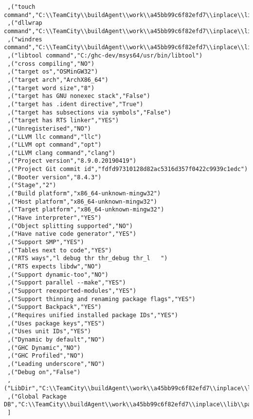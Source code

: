 \begin{verbatim}
 ,("touch command","C:\\TeamCity\\buildAgent\\work\\a45bb99c6f82efd7\\inplace\\lib/bin/touchy.exe")
 ,("dllwrap command","C:\\TeamCity\\buildAgent\\work\\a45bb99c6f82efd7\\inplace\\lib\\../mingw/bin/dllwrap.exe")
 ,("windres command","C:\\TeamCity\\buildAgent\\work\\a45bb99c6f82efd7\\inplace\\lib\\../mingw/bin/windres.exe")
 ,("libtool command","C:/ghc-dev/msys64/usr/bin/libtool")
 ,("cross compiling","NO")
 ,("target os","OSMinGW32")
 ,("target arch","ArchX86_64")
 ,("target word size","8")
 ,("target has GNU nonexec stack","False")
 ,("target has .ident directive","True")
 ,("target has subsections via symbols","False")
 ,("target has RTS linker","YES")
 ,("Unregisterised","NO")
 ,("LLVM llc command","llc")
 ,("LLVM opt command","opt")
 ,("LLVM clang command","clang")
 ,("Project version","8.9.0.20190419")
 ,("Project Git commit id","fdfd97310128d82ac5316d357f0422c9939c1edc")
 ,("Booter version","8.4.3")
 ,("Stage","2")
 ,("Build platform","x86_64-unknown-mingw32")
 ,("Host platform","x86_64-unknown-mingw32")
 ,("Target platform","x86_64-unknown-mingw32")
 ,("Have interpreter","YES")
 ,("Object splitting supported","NO")
 ,("Have native code generator","YES")
 ,("Support SMP","YES")
 ,("Tables next to code","YES")
 ,("RTS ways","l debug thr thr_debug thr_l   ")
 ,("RTS expects libdw","NO")
 ,("Support dynamic-too","NO")
 ,("Support parallel --make","YES")
 ,("Support reexported-modules","YES")
 ,("Support thinning and renaming package flags","YES")
 ,("Support Backpack","YES")
 ,("Requires unified installed package IDs","YES")
 ,("Uses package keys","YES")
 ,("Uses unit IDs","YES")
 ,("Dynamic by default","NO")
 ,("GHC Dynamic","NO")
 ,("GHC Profiled","NO")
 ,("Leading underscore","NO")
 ,("Debug on","False")
 ,("LibDir","C:\\TeamCity\\buildAgent\\work\\a45bb99c6f82efd7\\inplace\\lib")
 ,("Global Package DB","C:\\TeamCity\\buildAgent\\work\\a45bb99c6f82efd7\\inplace\\lib\\package.conf.d")
 ]
\end{verbatim}
